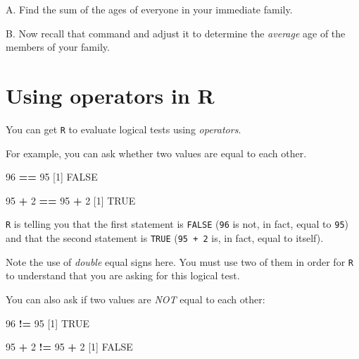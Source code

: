 \documentclass[
]{book}
\newenvironment{Shaded}{\begin{snugshade}}{\end{snugshade}}
\newcommand{\DecValTok}[1]{\textcolor[rgb]{0.00,0.00,0.81}{#1}}
\newcommand{\NormalTok}[1]{#1}
\newcommand{\OperatorTok}[1]{\textcolor[rgb]{0.81,0.36,0.00}{\textbf{#1}}}
\newcommand{\OtherTok}[1]{\textcolor[rgb]{0.56,0.35,0.01}{#1}}
\newcommand{\StringTok}[1]{\textcolor[rgb]{0.31,0.60,0.02}{#1}}
\begin{document}
A. Find the sum of the ages of everyone in your immediate family.

B. Now recall that command and adjust it to determine the \emph{average} age of the members of your family.

\hypertarget{using-operators-in-r}{%
\section*{Using operators in R}\label{using-operators-in-r}}

You can get \texttt{R} to evaluate logical tests using \emph{operators}.

For example, you can ask whether two values are equal to each other.

\begin{Shaded}
\begin{Highlighting}[]
\DecValTok{96} \OperatorTok{==}\StringTok{ }\DecValTok{95}
\NormalTok{[}\DecValTok{1}\NormalTok{] }\OtherTok{FALSE}

\DecValTok{95} \OperatorTok{+}\StringTok{ }\DecValTok{2} \OperatorTok{==}\StringTok{ }\DecValTok{95} \OperatorTok{+}\StringTok{ }\DecValTok{2}
\NormalTok{[}\DecValTok{1}\NormalTok{] }\OtherTok{TRUE}
\end{Highlighting}
\end{Shaded}

\texttt{R} is telling you that the first statement is \texttt{FALSE} (\texttt{96} is not, in fact, equal to \texttt{95}) and that the second statement is \texttt{TRUE} (\texttt{95\ +\ 2} is, in fact, equal to itself).

Note the use of \emph{double} equal signs here. You must use two of them in order for \texttt{R} to understand that you are asking for this logical test.

You can also ask if two values are \emph{NOT} equal to each other:

\begin{Shaded}
\begin{Highlighting}[]
\DecValTok{96} \OperatorTok{!=}\StringTok{ }\DecValTok{95}
\NormalTok{[}\DecValTok{1}\NormalTok{] }\OtherTok{TRUE}

\DecValTok{95} \OperatorTok{+}\StringTok{ }\DecValTok{2} \OperatorTok{!=}\StringTok{ }\DecValTok{95} \OperatorTok{+}\StringTok{ }\DecValTok{2}
\NormalTok{[}\DecValTok{1}\NormalTok{] }\OtherTok{FALSE}
\end{Highlighting}
\end{Shaded}
\end{document}
